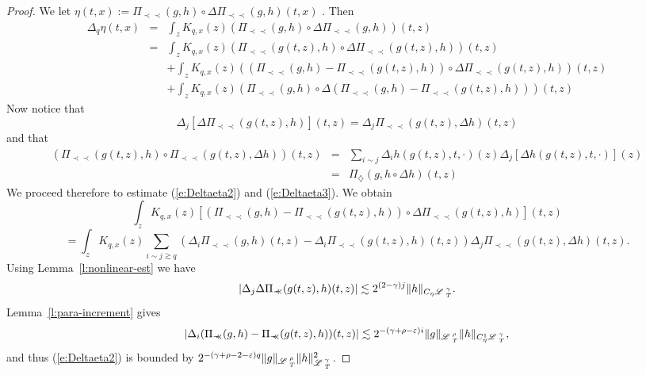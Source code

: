 \documentclass[11pt,reqno]{amsart}
\newcommand{\assign}{:=}
\newcommand{\cdummy}{\cdot}
\newcommand{\precprec}{\prec\!\!\!\prec}
\newcommand{\LL}{\mathscr{L} \hspace{.2em}}
\begin{document}
\begin{proof}
  We let $\eta (t, x) \assign \Pi_{\precprec} (g, h) \circ \Delta
  \Pi_{\precprec} (g, h) (t, x)$ . Then
  \begin{eqnarray}
    \Delta_q \eta (t, x) & = & \int_z K_{q, x} (z) (\Pi_{\precprec} (g, h)
    \circ \Delta \Pi_{\precprec} (g, h)) (t, z) \nonumber\\
    & = & \int_z K_{q, x} (z) (\Pi_{\precprec} (g (t, z), h) \circ \Delta
    \Pi_{\precprec} (g (t, z), h)) (t, z) \nonumber\\
    &  & + \int_z K_{q, x} (z) ((\Pi_{\precprec} (g, h) - \Pi_{\precprec} (g
    (t, z), h)) \circ \Delta \Pi_{\precprec} (g (t, z), h)) (t, z) 
    \label{e:Deltaeta2}\\
    &  & + \int_z K_{q, x} (z) (\Pi_{\precprec} (g, h) \circ \Delta
    (\Pi_{\precprec} (g, h) - \Pi_{\precprec} (g (t, z), h))) (t, z) 
    \label{e:Deltaeta3}
  \end{eqnarray}
  Now notice that
  \[ \Delta_j [\Delta \Pi_{\precprec} (g (t, z), h)] (t, z) = \Delta_j
     \Pi_{\precprec} (g (t, z), \Delta h) (t, z) \]
  and that
  \begin{eqnarray*}
    (\Pi_{\precprec} (g (t, z), h) \circ \Pi_{\precprec} (g (t, z), \Delta h))
    (t, z) & = & \sum_{i \sim j} \Delta_i h (g (t, z), t, \cdummy) (z)
    \Delta_j [\Delta h (g (t, z), t, \cdummy)] (z)\\
    & = & \Pi_{\diamondsuit} (g, h \circ \Delta h) (t, z)
  \end{eqnarray*}
  We proceed therefore to estimate (\ref{e:Deltaeta2}) and
  (\ref{e:Deltaeta3}). We obtain
  \[ \int_z K_{q, x} (z) [(\Pi_{\precprec} (g, h) - \Pi_{\precprec} (g (t, z),
     h)) \circ \Delta \Pi_{\precprec} (g (t, z), h)] (t, z) \]
  \[ = \int_z K_{q, x} (z) \sum_{i \sim j \gtrsim q} (\Delta_i \Pi_{\precprec}
     (g, h) (t, z) - \Delta_i \Pi_{\precprec} (g (t, z), h) (t, z)) \Delta_j
     \Pi_{\precprec} (g (t, z), \Delta h) (t, z) . \]
  Using Lemma~\ref{l:nonlinear-est} we have
  \[ | \Delta_j \Delta \Pi_{\precprec} (g (t, z), h) (t, z) | \lesssim 2^{(2 -
     \gamma) j} \| h \|_{C_{\eta} \LL^{\gamma}_T} . \]
  Lemma~\ref{l:para-increment} gives
  \[ | \Delta_i (\Pi_{\precprec} (g, h) - \Pi_{\precprec} (g (t, z), h)) (t,
     z) | \lesssim 2^{- (\gamma + \rho - \varepsilon) i} \| g
     \|_{\LL^{\rho}_T} \| h \|_{C_{\eta}^1 \LL^{\gamma}_{_T}}, \]
  and thus (\ref{e:Deltaeta2}) is bounded by $2^{- (\gamma + \rho - 2 -
  \varepsilon) q} \| g \|_{\LL^{\rho}_T} \| h \|^2_{\LL^{\gamma}_{_T}}$.
  

\end{proof}
\end{document}
